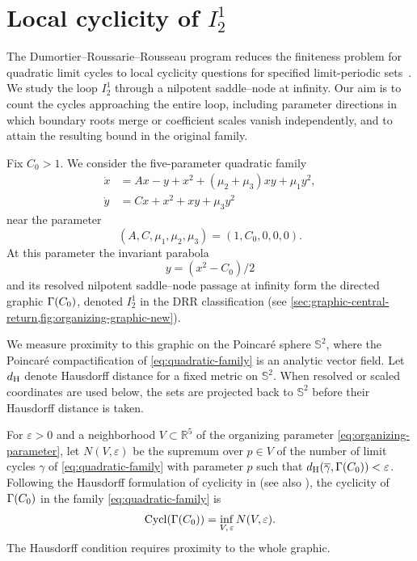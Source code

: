 \section{Local cyclicity of \texorpdfstring{\(I_2^1\)}{I21}}
\label{sec:introduction}

The Dumortier--Roussarie--Rousseau program reduces the finiteness
problem for quadratic limit cycles to local cyclicity questions for
specified limit-periodic sets~\cite{DRR1994}. We study the loop
\(I_2^1\) through a nilpotent saddle--node at infinity. Our aim is
to count the cycles approaching the entire loop, including parameter
directions in which boundary roots merge or coefficient scales vanish
independently, and to attain the resulting bound in the original family.

Fix \(C_0>1\). We consider the five-parameter quadratic family
\begin{equation}
\label{eq:quadratic-family}
\begin{aligned}
 \dot x&=Ax-y+x^2+(\mu_2+\mu_3)xy+\mu_1y^2,\\
 \dot y&=Cx+x^2+xy+\mu_3y^2
\end{aligned}
\end{equation}
near the parameter
\begin{equation}
\label{eq:organizing-parameter}
 (A,C,\mu_1,\mu_2,\mu_3)=(1,C_0,0,0,0).
\end{equation}
At this parameter the invariant parabola
\begin{equation}
\label{eq:organizing-parabola}
 y=(x^2-C_0)/2
\end{equation}
and its resolved nilpotent saddle--node passage at infinity form
the directed graphic \(\Gamma(C_0)\), denoted \(I_2^1\) in the DRR
classification \cite[Proposition~4.2.2(6), Figure~8(6)]{DRR1994}
(see \cref{sec:graphic-central-return,fig:organizing-graphic-new}).

We measure proximity to this graphic on the Poincar\'e sphere
\(\mathbb S^2\), where the Poincar\'e compactification of
\eqref{eq:quadratic-family} is an analytic vector field. Let
\(d_{\mathrm H}\) denote Hausdorff distance for a fixed metric on
\(\mathbb S^2\). When resolved or scaled coordinates are used below,
the sets are projected back to \(\mathbb S^2\) before their Hausdorff
distance is taken.

For \(\varepsilon>0\) and a neighborhood \(V\subset\mathbb R^5\) of the
organizing parameter \eqref{eq:organizing-parameter}, let
\(N(V,\varepsilon)\) be the supremum over \(p\in V\) of the number of
limit cycles \(\gamma\) of \eqref{eq:quadratic-family} with parameter
\(p\) such that \(d_{\mathrm H}(\overline\gamma,\Gamma(C_0))<\varepsilon\).
Following the Hausdorff formulation of cyclicity in
\cite[Definition~2.2(2)]{DRR1994} (see also
\cite[\S2.2.1]{Roussarie1998}), the cyclicity of
\(\Gamma(C_0)\) in the family \eqref{eq:quadratic-family} is
\begin{equation}
\label{eq:cyclicity-definition}
 \operatorname{Cycl}(\Gamma(C_0))=\inf_{V,\,\varepsilon}N(V,\varepsilon).
\end{equation}
The Hausdorff condition requires proximity to the whole graphic.

